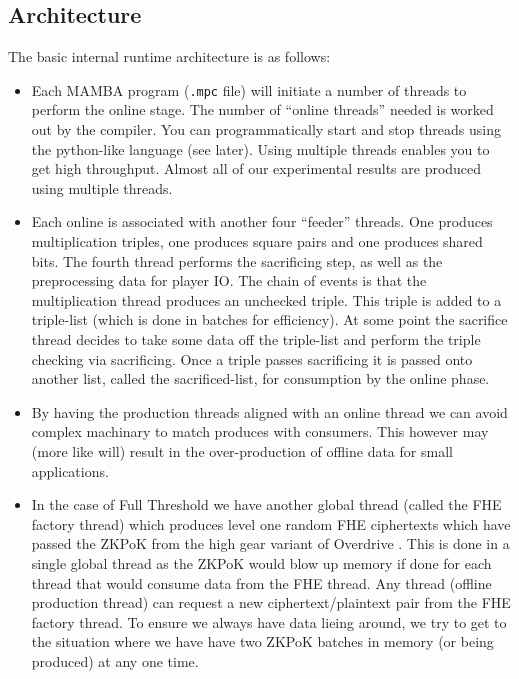 \subsection{Architecture}
The basic internal runtime architecture is as follows:
\begin{itemize}
\item Each MAMBA program (\verb+.mpc+ file) will initiate a number of threads
to perform the online stage.
The number of ``online threads'' needed is worked out by the compiler. You
can programmatically start and stop threads using the python-like
language (see later).
Using multiple threads enables you to get high throughput. Almost all
of our experimental results are produced using multiple threads.
\item Each online is associated with another four ``feeder'' threads.
One produces multiplication triples, one produces square pairs
and one produces shared bits.
The fourth thread performs the sacrificing step, as well as
the preprocessing data for player IO.
The chain of events is that the multiplication thread produces
an unchecked triple. This triple is added to a triple-list (which is
done in batches for efficiency).
At some point the sacrifice thread decides to take some
data off the triple-list and perform the triple checking via
sacrificing.
Once a triple passes sacrificing it is passed onto another
list, called the sacrificed-list, for consumption by the online phase.
\item By having the production threads aligned with an online
thread we can avoid complex machinary to match produces with
consumers. This however may (more like will) result in the 
over-production of offline data for small applications.
\item In the case of Full Threshold we have another global
thread (called the FHE factory thread) which produces level one 
random FHE ciphertexts which have passed the ZKPoK from the high 
gear variant of Overdrive \cite{KPR}.
This is done in a single global thread as the ZKPoK would
blow up memory if done for each thread that would consume 
data from the FHE thread.
Any thread (offline production thread) can request a new
ciphertext/plaintext pair from the FHE factory thread.
To ensure we always have data lieing around, we try 
to get to the situation where we have have two 
ZKPoK batches in memory (or being produced) at any
one time.
\end{itemize}


